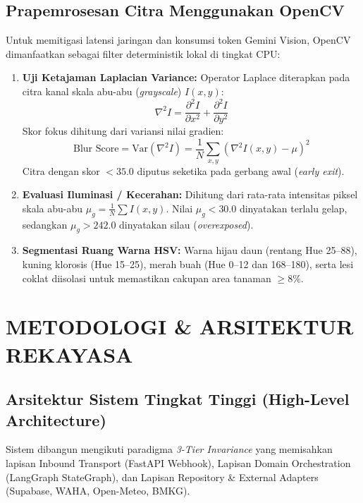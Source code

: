 \documentclass[11pt,a4paper]{article}
\begin{document}
\subsection{Prapemrosesan Citra Menggunakan OpenCV}
Untuk memitigasi latensi jaringan dan konsumsi token Gemini Vision, OpenCV dimanfaatkan sebagai filter deterministik lokal di tingkat CPU:
\begin{enumerate}
    \item \textbf{Uji Ketajaman Laplacian Variance:}
    Operator Laplace diterapkan pada citra kanal skala abu-abu (\textit{grayscale}) $I(x,y)$:
    \begin{equation}
        \nabla^2 I = \frac{\partial^2 I}{\partial x^2} + \frac{\partial^2 I}{\partial y^2}
    \end{equation}
    Skor fokus dihitung dari variansi nilai gradien:
    \begin{equation}
        \text{Blur Score} = \text{Var}(\nabla^2 I) = \frac{1}{N} \sum_{x,y} \left( \nabla^2 I(x,y) - \mu \right)^2
    \end{equation}
    Citra dengan skor $< 35.0$ diputus seketika pada gerbang awal (\textit{early exit}).
    \item \textbf{Evaluasi Iluminasi / Kecerahan:}
    Dihitung dari rata-rata intensitas piksel skala abu-abu $\mu_g = \frac{1}{N} \sum I(x,y)$. Nilai $\mu_g < 30.0$ dinyatakan terlalu gelap, sedangkan $\mu_g > 242.0$ dinyatakan silau (\textit{overexposed}).
    \item \textbf{Segmentasi Ruang Warna HSV:}
    Warna hijau daun (rentang Hue 25--88), kuning klorosis (Hue 15--25), merah buah (Hue 0--12 dan 168--180), serta lesi coklat diisolasi untuk memastikan cakupan area tanaman $\ge 8\%$.
\end{enumerate}

\section{METODOLOGI \& ARSITEKTUR REKAYASA}

\subsection{Arsitektur Sistem Tingkat Tinggi (High-Level Architecture)}
Sistem dibangun mengikuti paradigma \textit{3-Tier Invariance} yang memisahkan lapisan Inbound Transport (FastAPI Webhook), Lapisan Domain Orchestration (LangGraph StateGraph), dan Lapisan Repository \& External Adapters (Supabase, WAHA, Open-Meteo, BMKG).
\end{document}
